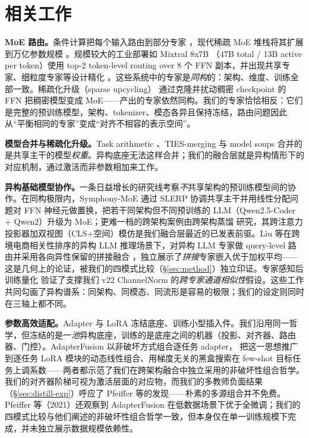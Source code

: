 \documentclass[10pt,twoside]{article}
\begin{document}
\section{相关工作}
\label{sec:related}

\textbf{MoE 路由。}条件计算把每个输入路由到部分专家 \citep{jacobs1991,shazeerOutrageouslyLargeNeural2017}，现代稀疏 MoE 堆栈将其扩展到万亿参数规模 \citep{fedus2022,zoph2022}。规模较大的工业部署如 Mixtral 8x7B \citep{jiang2024mixtral}（47B total / 13B active per token）使用 top-2 token-level routing over 8 个 FFN 副本，并出现共享专家、细粒度专家等设计精化 \citep{dai2024}。这些系统中的专家是\emph{同构}的：架构、维度、训练全部一致。稀疏化升级（sparse upcycling）\citep{komatsuzaki2023} 通过克隆并扰动稠密 checkpoint 的 FFN 把稠密模型变成 MoE——产出的专家依然同构。我们的专家恰恰相反：它们是完整的预训练模型，架构、tokenizer、模态各异且保持冻结，路由问题因此从``平衡相同的专家''变成``对齐不相容的表示空间''。

\textbf{模型合并与稀疏化升级。}Task arithmetic \citep{ilharco2023}、TIES-merging \citep{yadav2023} 与 model soups \citep{wortsman2022} 合并的是共享主干的模型\emph{权重}。异构底座无法这样合并；我们的融合层就是异构情形下的对应机制，通过激活而非参数相加来工作。

\textbf{异构基础模型协作。}一条日益增长的研究线考察\emph{不}共享架构的预训练模型间的协作。在同构极限内，Symphony-MoE \citep{wang2025symphony} 通过 SLERP 协调共享主干并用线性分配问题对 FFN 神经元做置换，把若干同架构但不同预训练的 LLM（Qwen2.5-Coder + Qwen2）升级为 MoE；更难一档的跨架构案例由跨架构蒸馏 \citep{wang2024scalekd} 研究，其跨注意力投影器加双视图（CLS+空间）模仿是我们融合层最近的已发表前驱。Liu 等在跨境电商相关性排序的异构 LLM 推理场景下，对异构 LLM 专家做 query-level 路由并采用各向异性保留的拼接融合 \citep{liu2026orchestrating}，独立展示了\emph{拼接}专家嵌入优于加权平均——这是几何上的论证，被我们的四模式比较（\S\ref{sec:method}）独立印证。专家感知后训练量化 \citep{du2026eaquant} 验证了支撑我们 v22 ChannelNorm 的\emph{跨专家通道相似性}假设。这些工作共同勾画了异构谱系：同架构、同模态、同流形是容易的极限；我们的设定则同时在三轴上都不同。

\textbf{参数高效适配。}Adapter \citep{houlsby2019} 与 LoRA \citep{hu2022} 冻结底座、训练小型插入件。我们沿用同一哲学，但冻结的是一\emph{池}异构底座，训练的是底座之间的机器（投影、对齐器、路由器、门控）。AdapterFusion \citep{pfeiffer2021} 以非破坏方式组合逐任务 adapter，\citet{huang2024lorahub} 把这一思想推广到逐任务 LoRA 模块的动态线性组合、用梯度无关的黑盒搜索在 few-shot 目标任务上调系数——两者都示范了我们在跨架构融合中独立采用的非破坏性组合哲学。我们的对齐器阶梯可视为激活层面的对应物，而我们的多教师负面结果（\S\ref{sec:distill-exp}）呼应了 Pfeiffer 等的发现——朴素的多源组合并不免费。Pfeiffer 等（2021）还观察到 AdapterFusion 在低数据场景下优于全微调；我们的四模式比较与他们阐述的非破坏性组合哲学一致，但本身仅在单一训练规模下完成，并未独立展示数据规模依赖性。
\end{document}
